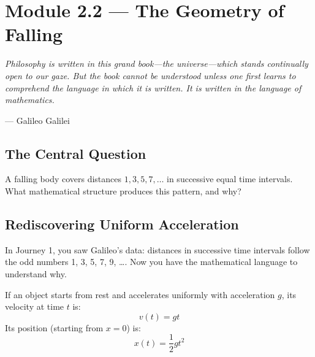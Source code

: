 \documentclass[12pt, a4paper, twoside]{book}
\theoremstyle{disc}
\begin{document}
\setcounter{chapter}{1}
\setcounter{section}{1}

\section{Module 2.2 — The Geometry of Falling}
\label{sec:falling_geometry}

\epigraph{
  \itshape Philosophy is written in this grand book---the universe---which stands continually open to our gaze. But the book cannot be understood unless one first learns to comprehend the language in which it is written. It is written in the language of mathematics.
}{--- Galileo Galilei}

\subsection{The Central Question}

\begin{tcolorbox}[colback=deep!5, colframe=deep, fontupper=\large\bfseries\color{deep}]
A falling body covers distances $1, 3, 5, 7, \ldots$ in successive equal time intervals. What mathematical structure produces this pattern, and why?
\end{tcolorbox}

\subsection{Rediscovering Uniform Acceleration}

In Journey 1, you saw Galileo's data: distances in successive time intervals follow the odd numbers 1, 3, 5, 7, 9, \ldots. Now you have the mathematical language to understand why.

If an object starts from rest and accelerates uniformly with acceleration $g$, its velocity at time $t$ is:
\begin{equation}
  v(t) = g t
\end{equation}
Its position (starting from $x = 0$) is:
\begin{equation}
  x(t) = \frac{1}{2} g t^2
\end{equation}
\end{document}
